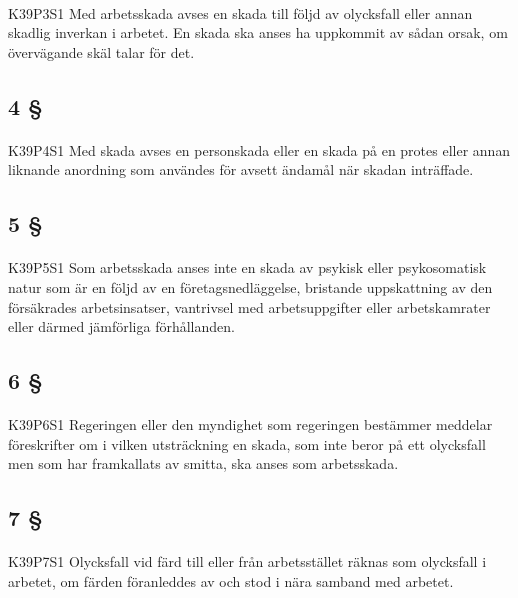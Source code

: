 \documentclass[a4paper,notitlepage,openany,10pt]{book}
\begin{document}
\paragraph*{}
{\tiny K39P3S1}
Med arbetsskada avses en skada till följd av olycksfall eller annan skadlig inverkan i arbetet. En skada ska anses ha uppkommit av sådan orsak, om övervägande skäl talar för det.
\subsection*{4 §}
\paragraph*{}
{\tiny K39P4S1}
Med skada avses en personskada eller en skada på en protes eller annan liknande anordning som användes för avsett ändamål när skadan inträffade.
\subsection*{5 §}
\paragraph*{}
{\tiny K39P5S1}
Som arbetsskada anses inte en skada av psykisk eller psykosomatisk natur som är en följd av en företagsnedläggelse, bristande uppskattning av den försäkrades arbetsinsatser, vantrivsel med arbetsuppgifter eller arbetskamrater eller därmed jämförliga förhållanden.
\subsection*{6 §}
\paragraph*{}
{\tiny K39P6S1}
Regeringen eller den myndighet som regeringen bestämmer meddelar föreskrifter om i vilken utsträckning en skada, som inte beror på ett olycksfall men som har framkallats av smitta, ska anses som arbetsskada.
\subsection*{7 §}
\paragraph*{}
{\tiny K39P7S1}
Olycksfall vid färd till eller från arbetsstället räknas som olycksfall i arbetet, om färden föranleddes av och stod i nära samband med arbetet.
\end{document}

